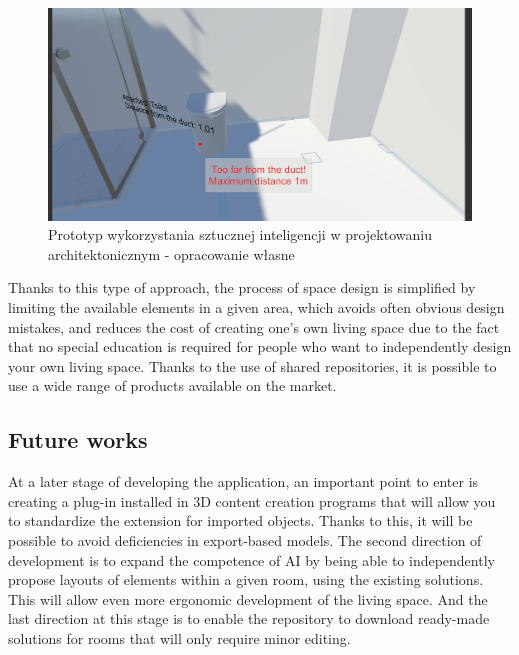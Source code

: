 \documentclass[runningheads]{llncs}
\begin{document}
\begin{figure}[H]
\centering
\includegraphics[width=\textwidth]{aplikacja3.png}
\caption{Prototyp wykorzystania sztucznej inteligencji w projektowaniu architektonicznym - 
opracowanie własne} \label{fig8}
\end{figure}

Thanks to this type of approach, the process of space design is simplified by limiting the available elements in a given area, which avoids often obvious design mistakes, and reduces the cost of creating one's own living space due to the fact that no special education is required for people who want to independently design your own living space. Thanks to the use of shared repositories, it is possible to use a wide range of products available on the market.

\subsection{Future works}
At a later stage of developing the application, an important point to enter is creating a plug-in installed in 3D content creation programs that will allow you to standardize the extension for imported objects. Thanks to this, it will be possible to avoid deficiencies in export-based models. The second direction of development is to expand the competence of AI by being able to independently propose layouts of elements within a given room, using the existing solutions. This will allow even more ergonomic development of the living space. And the last direction at this stage is to enable the repository to download ready-made solutions for rooms that will only require minor editing.
\end{document}

